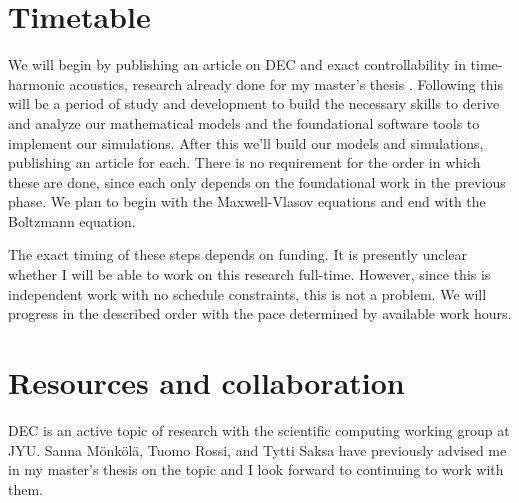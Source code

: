 \documentclass{article}
\begin{document}
\section*{Timetable}

We will begin by publishing an article on DEC and exact controllability
in time-harmonic acoustics, research already done for my master's thesis
\parencite{myyra_discrete_2023}.
Following this will be a period of study and development
to build the necessary skills to derive and analyze our mathematical models
and the foundational software tools to implement our simulations.
After this we'll build our models and simulations,
publishing an article for each.
There is no requirement for the order in which these are done,
since each only depends on the foundational work in the previous phase.
We plan to begin with the Maxwell-Vlasov equations and end with the Boltzmann equation.

The exact timing of these steps depends on funding.
It is presently unclear whether I will be able to work on this research full-time.
However, since this is independent work with no schedule constraints,
this is not a problem.
We will progress in the described order with the pace determined by available work hours.

\section*{Resources and collaboration}

DEC is an active topic of research with the scientific computing working group at JYU.
Sanna Mönkölä, Tuomo Rossi, and Tytti Saksa
have previously advised me in my master's thesis on the topic
and I look forward to continuing to work with them.

\printbibliography
\end{document}
